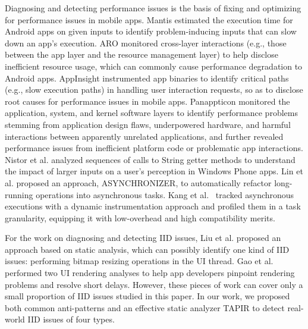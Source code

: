 Diagnosing and detecting performance issues is the basis of fixing and optimizing for performance issues in mobile apps.
Mantis\cite{kwon2013mantis} estimated the execution time for Android apps on given inputs to identify problem-inducing inputs that can slow down an app's execution. 
ARO\cite{qian2011profiling} monitored cross-layer interactions (e.g., those between the app layer and the resource management layer) to help disclose inefficient resource usage, which can commonly cause performance degradation to Android apps. 
AppInsight\cite{ravindranath2012appinsight} instrumented app binaries to identify critical paths (e.g., slow execution paths) in handling user interaction requests, so as to disclose root causes for performance issues in mobile apps. 
Panappticon\cite{zhang2013panappticon} monitored the application, system, and kernel software layers to identify performance problems stemming from application design flaws, underpowered hardware, and harmful interactions between apparently unrelated applications, and further revealed performance issues from inefficient platform code or problematic app interactions.
Nistor et al.\cite{nistor2014suncat} analyzed sequences of calls to String getter methods to understand the impact of larger inputs on a user’s perception in Windows Phone apps. 
Lin et al.\cite{lin2014retrofitting} proposed an approach, ASYNCHRONIZER, to automatically refactor long-running operations into asynchronous tasks.  
Kang et al.~\cite{kang2016diagdroid} tracked asynchronous executions with a dynamic instrumentation approach and profiled them in a task granularity, equipping it with low-overhead and high compatibility merits.

For the work on diagnosing and detecting IID issues, 
Liu et al.\cite{liu2014characterizing} proposed an approach based on static analysis, which can possibly identify one kind of IID issues: performing bitmap resizing operations in the UI thread. 
Gao et al.~\cite{gao2017every} performed two UI rendering analyses to help app developers pinpoint rendering problems and resolve short delays. However, these pieces of work can cover only a small proportion of IID issues studied in this paper. In our work, we proposed both common anti-patterns and an effective static analyzer TAPIR to detect real-world IID issues of four types.

